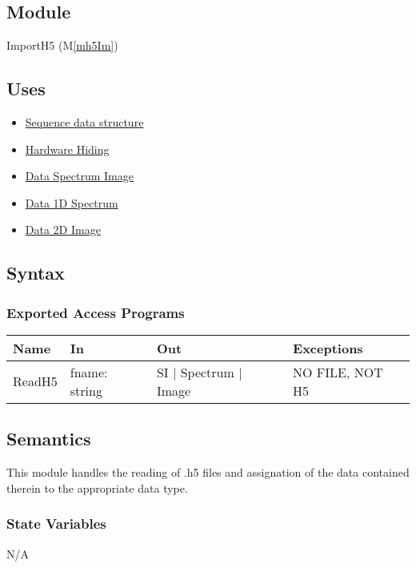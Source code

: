 \documentclass[12pt, titlepage]{article}
\newcommand{\mref}[1]{M\ref{#1}}
\begin{document}
\subsection{Module}
ImportH5 (\mref{mh5Im})

\subsection{Uses}
\begin{itemize}
    \item \hyperref[Mod:Seq]{Sequence data structure}
    \item \hyperref[Mod:HH]{Hardware Hiding}
    \item \hyperref[Mod:SI]{Data Spectrum Image}
    \item \hyperref[Mod:Spectrum]{Data 1D Spectrum}
    \item \hyperref[Mod:Image]{Data 2D Image}
\end{itemize}

\subsection{Syntax}

\subsubsection{Exported Access Programs}

\begin{center}
    \begin{tabular}{p{2cm} p{4cm} p{4cm} p{2cm}}
        \hline
        \textbf{Name} & \textbf{In} & \textbf{Out} & \textbf{Exceptions} \\
        \hline
        ReadH5 & fname: string & SI $|$ Spectrum $|$ Image & NO FILE, NOT H5 \\
        \hline
    \end{tabular}
\end{center}

\subsection{Semantics}
This module handles the reading of .h5 files and assignation of the data
contained therein to the appropriate data type.

\subsubsection{State Variables}
N/A
\end{document}
